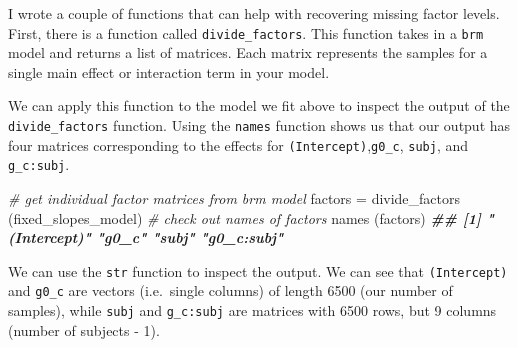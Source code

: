 \documentclass[
]{book}
\newenvironment{Shaded}{\begin{snugshade}}{\end{snugshade}}
\newcommand{\CommentTok}[1]{\textcolor[rgb]{0.56,0.35,0.01}{\textit{#1}}}
\newcommand{\DocumentationTok}[1]{\textcolor[rgb]{0.56,0.35,0.01}{\textbf{\textit{#1}}}}
\newcommand{\FunctionTok}[1]{\textcolor[rgb]{0.00,0.00,0.00}{#1}}
\newcommand{\NormalTok}[1]{#1}
\newcommand{\OtherTok}[1]{\textcolor[rgb]{0.56,0.35,0.01}{#1}}
\begin{document}
I wrote a couple of functions that can help with recovering missing factor levels. First, there is a function called \texttt{divide\_factors}. This function takes in a \texttt{brm} model and returns a list of matrices. Each matrix represents the samples for a single main effect or interaction term in your model.

We can apply this function to the model we fit above to inspect the output of the \texttt{divide\_factors} function. Using the \texttt{names} function shows us that our output has four matrices corresponding to the effects for \texttt{(Intercept)},\texttt{g0\_c}, \texttt{subj}, and \texttt{g\_c:subj}.

\begin{Shaded}
\begin{Highlighting}[]
\CommentTok{\# get individual factor matrices from brm model}
\NormalTok{factors }\OtherTok{=} \FunctionTok{divide\_factors}\NormalTok{ (fixed\_slopes\_model)}
\CommentTok{\# check out names of factors}
\FunctionTok{names}\NormalTok{ (factors)}
\DocumentationTok{\#\# [1] "(Intercept)" "g0\_c"        "subj"        "g0\_c:subj"}
\end{Highlighting}
\end{Shaded}

We can use the \texttt{str} function to inspect the output. We can see that \texttt{(Intercept)} and \texttt{g0\_c} are vectors (i.e.~single columns) of length 6500 (our number of samples), while \texttt{subj} and \texttt{g\_c:subj} are matrices with 6500 rows, but 9 columns (number of subjects - 1).

\begin{Shaded}
\end{Shaded}
\end{document}
